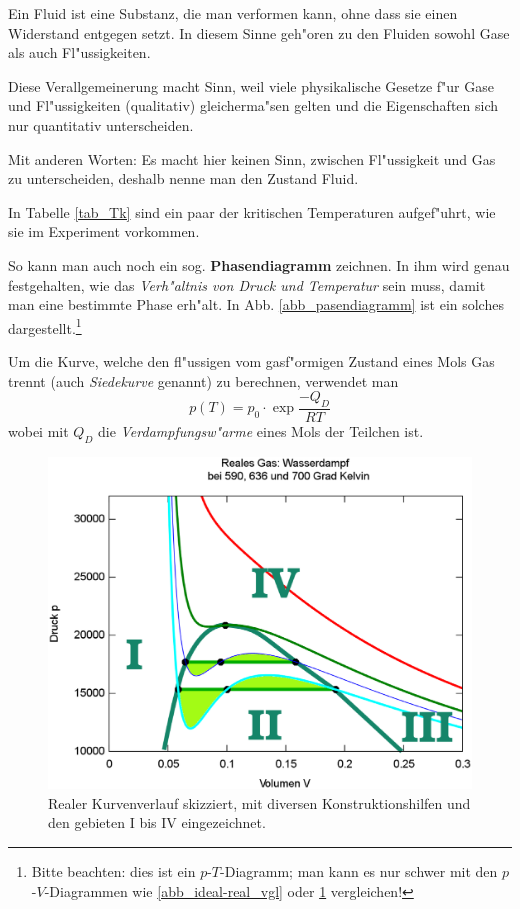 \begin{Def} 
    Ein Fluid ist eine
   Substanz, die man verformen kann, ohne dass sie einen Widerstand
   entgegen setzt. In diesem Sinne geh"oren zu den Fluiden sowohl Gase
   als auch Fl"ussigkeiten.
\end{Def}

Diese Verallgemeinerung macht Sinn, weil viele physikalische Gesetze
f"ur Gase und Fl"ussigkeiten (qualitativ) gleicherma"sen gelten und
die Eigenschaften sich nur quantitativ unterscheiden.

Mit anderen Worten: Es macht hier keinen Sinn, zwischen Fl"ussigkeit
und Gas zu unterscheiden, deshalb nenne man den Zustand Fluid.

In Tabelle \ref{tab_Tk} sind ein paar der kritischen Temperaturen
aufgef"uhrt, wie sie im Experiment vorkommen.

\bigskip
\noindent

So kann man auch noch ein
sog. \textbf{Phasendiagramm} zeichnen. In ihm
wird genau festgehalten, wie das \emph{Verh"altnis von Druck und
  Temperatur} sein muss, damit man eine bestimmte Phase erh"alt. In
Abb. \ref{abb_pasendiagramm} ist ein solches
dargestellt.\footnote{Bitte beachten: dies ist ein $p$-$T$-Diagramm;
  man kann es nur schwer mit den $p$-$V$-Diagrammen wie
  \ref{abb_ideal-real_vgl} oder \ref{abb_real-richtig} vergleichen!} 

Um die Kurve, welche den fl"ussigen vom gasf"ormigen Zustand eines Mols Gas
trennt (auch \emph{Siedekurve} genannt) zu berechnen, verwendet man
$$
p(T) = p_0 \cdot \exp \frac{-Q_D}{RT}
$$
wobei mit $Q_D$ die \emph{Verdampfungsw"arme} eines Mols der Teilchen ist.






\begin{figure}[h]
   \centering
   \includegraphics[width=12cm]{bilder/real2c_mod2}
   \caption[p-V-Diagramm reales Gas]{Realer Kurvenverlauf skizziert,
     mit diversen Konstruktionshilfen und den gebieten I bis IV
     eingezeichnet.}
   \label{abb_real-richtig}
\end{figure}



